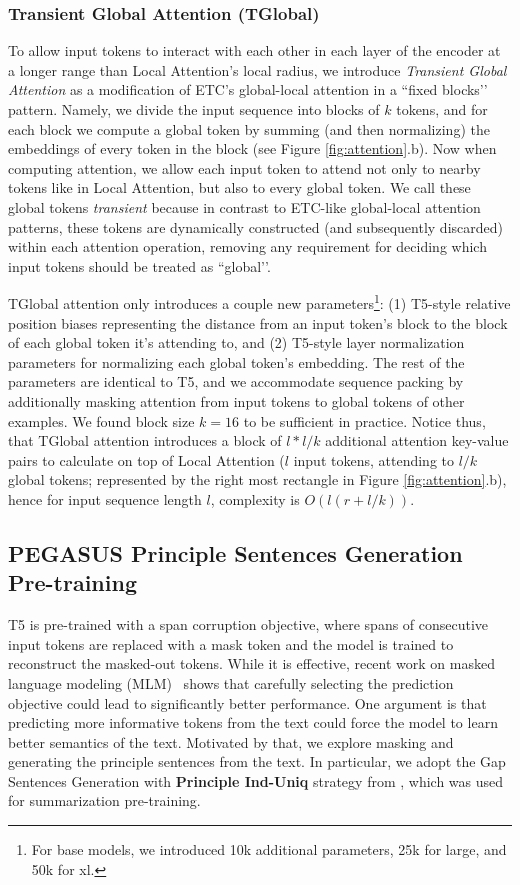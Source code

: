 \subsubsection{Transient Global Attention (TGlobal)} To allow input tokens to interact with each other in each layer of the encoder at a longer range than Local Attention’s local radius, we introduce {\em Transient Global Attention} as a modification of ETC’s global-local attention in a ``fixed blocks’’ pattern.  Namely, we divide the input sequence into blocks of $k$ tokens, and for each block we compute a global token by summing (and then normalizing) the embeddings of every token in the block (see Figure \ref{fig:attention}.b).  Now when computing attention, we allow each input token to attend not only to nearby tokens like in Local Attention, but also to every global token. We call these global tokens \emph{transient} because in contrast to ETC-like global-local attention patterns, these tokens are dynamically constructed (and subsequently discarded) within each attention operation, removing any requirement for deciding which input tokens should be treated as ``global’’.

TGlobal attention only introduces a couple new parameters\footnote{For base models, we introduced 10k additional parameters, 25k for large, and 50k for xl.}: (1) T5-style relative position biases representing the distance from an input token’s block to the block of each global token it’s attending to, and (2) T5-style layer normalization parameters for normalizing each global token’s embedding.  The rest of the parameters are identical to T5, and we accommodate sequence packing by additionally masking attention from input tokens to global tokens of other examples.  We found block size $k = 16$ to be sufficient in practice. Notice thus, that TGlobal attention introduces a block of $l * l/k$ additional attention key-value pairs to calculate on top of Local Attention ($l$ input tokens, attending to $l/k$ global tokens; represented by the right most rectangle in Figure \ref{fig:attention}.b), hence for input sequence length $l$, complexity is $O(l(r + l/k))$.

\subsection{PEGASUS Principle Sentences Generation Pre-training}
\label{sec:pegasus}
T5 is pre-trained with a span corruption objective, where spans of consecutive input tokens are replaced with a mask token and the model is trained to reconstruct the masked-out tokens. While it is effective, recent work on masked language modeling (MLM)~\cite{liu2019roberta,zhang-etal-2019-ernie} shows that carefully selecting the prediction objective could lead to significantly better performance. One argument is that predicting more informative tokens from the text could force the model to learn better semantics of the text. Motivated by that, we explore masking and generating the principle sentences from the text. In particular, we adopt the Gap Sentences Generation with \textbf{Principle Ind-Uniq} strategy from \citet{pegasus}, which was used for summarization pre-training.

